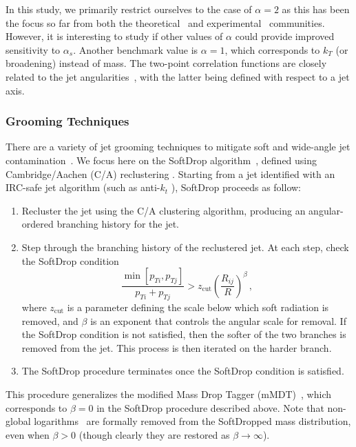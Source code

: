 \documentclass[11pt]{cernrep}
\begin{document}
In this study, we primarily restrict ourselves to the case of $\alpha=2$ as this has been the focus so far from both the theoretical~\cite{Frye:2016okc,Frye:2016aiz,Marzani:2017mva,Marzani:2017kqd} and experimental~\cite{Aaboud:2017qwh,CMS-PAS-SMP-16-010} communities.
%
However, it is interesting to study if other values of $\alpha$ could provide improved sensitivity to $\alpha_s$.
%
Another benchmark value is $\alpha=1$, which corresponds to $k_T$ (or broadening) instead of mass.
%
The two-point correlation functions are closely related to the jet angularities~\cite{Berger:2003iw,Almeida:2008yp,Ellis:2010rwa,Larkoski:2014pca}, with the latter being defined with respect to a jet axis.

\subsubsection{Grooming Techniques}\label{jetsub_alphas_sec:groom_tech}

There are a variety of jet grooming techniques to mitigate soft and wide-angle jet contamination~\cite{Butterworth:2008iy,Ellis:2009su,Ellis:2009me,Krohn:2009th,Dasgupta:2013ihk,Larkoski:2014wba}.
%
We focus here on the SoftDrop algorithm~\cite{Larkoski:2014wba}, defined using Cambridge/Aachen (C/A) reclustering \cite{Dokshitzer:1997in,Wobisch:1998wt,Wobisch:2000dk}.
%
Starting from a jet identified with an IRC-safe jet algorithm (such as anti-$k_t$ \cite{Cacciari:2008gp}), SoftDrop proceeds as follow:
%
\begin{enumerate}
%
\item Recluster the jet using the C/A clustering algorithm, producing an angular-ordered branching history for the jet.
%
\item Step through the branching history of the reclustered jet.  At each step, check the SoftDrop condition
%
\begin{equation}\label{jetsub_alphas_eq:sd_cut}
\frac{\min\left[ p_{Ti}, p_{Tj}  \right]}{p_{Ti}+p_{Tj}}> z_{\mathrm{cut}} \left(   \frac{R_{ij}}{R}\right)^\beta \,,
\end{equation}
%
where $z_{\mathrm{cut}} $ is a parameter defining the scale below which soft radiation is removed, and $\beta$ is an exponent that controls the angular scale for removal.
%
If the SoftDrop condition is not satisfied, then the softer of the two branches is removed from the jet.  This process is then iterated on the harder branch.
%
\item The SoftDrop procedure terminates once the SoftDrop condition is satisfied.
%
\end{enumerate}
%
This procedure generalizes the modified Mass Drop Tagger (mMDT)~\cite{Dasgupta:2013ihk}, which corresponds to $\beta=0$ in the SoftDrop procedure described above.
%
Note that non-global logarithms~\cite{Dasgupta:2001sh} are formally removed from the SoftDropped mass distribution, even when $\beta>0$ (though clearly they are restored as $\beta\rightarrow\infty$).
\end{document}
